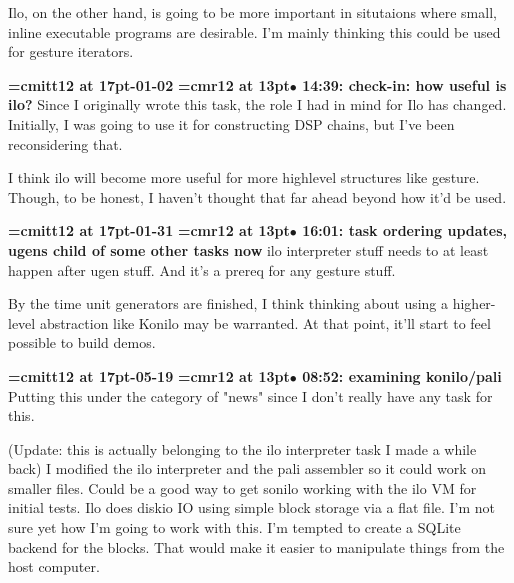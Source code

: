 Ilo, on the other hand, is going to be more important in situtaions where small, inline executable programs are desirable. I'm mainly thinking this could be used for  gesture iterators.
\par

{\medskip\noindent\bf\font\titlefont=cmitt12 at 17pt-01-02}\medskip
{\smallskip\noindent\bf\font\titlefont=cmr12 at 13pt\titlefont $\bullet$ 14:39: check-in: how useful is ilo?}\smallskip
Since I originally wrote this task, the role I had in mind for Ilo has changed. Initially, I was going to use it for constructing DSP chains, but I've been reconsidering that.
\par

I think ilo will become more useful for more highlevel structures like gesture. Though, to be honest, I haven't thought that far ahead beyond how it'd be used.
\par

{\medskip\noindent\bf\font\titlefont=cmitt12 at 17pt-01-31}\medskip
{\smallskip\noindent\bf\font\titlefont=cmr12 at 13pt\titlefont $\bullet$ 16:01: task ordering updates, ugens child of some other tasks now}\smallskip
ilo interpreter stuff needs to at least happen after ugen stuff. And it's a prereq for any gesture stuff.
\par

By the time unit generators are finished, I think thinking about using a higher-level abstraction like Konilo may be warranted. At that point, it'll start to feel possible to build demos.
\par

{\medskip\noindent\bf\font\titlefont=cmitt12 at 17pt-05-19}\medskip
{\smallskip\noindent\bf\font\titlefont=cmr12 at 13pt\titlefont $\bullet$ 08:52: examining konilo/pali}\smallskip
Putting this under the category of "news" since I don't really have any task for this.
\par

(Update: this is actually belonging to the ilo interpreter task I made a while back) I modified the ilo interpreter and the pali assembler so it could work on smaller files. Could be a good way to get sonilo working with the ilo VM for initial tests. Ilo does diskio IO using simple block storage via a flat file. I'm not sure yet how I'm going to work with this. I'm tempted to create a SQLite backend for the blocks. That would make it easier to manipulate things from the host computer.
\par

